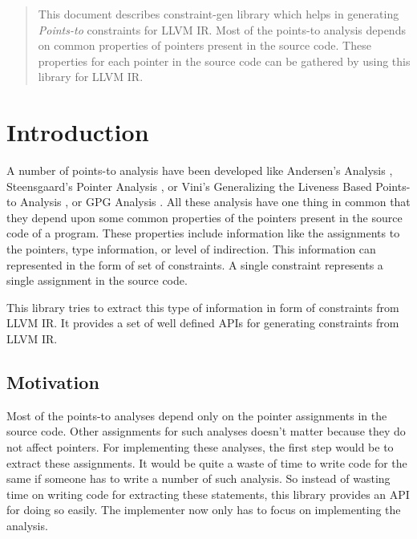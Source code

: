 \documentclass[a4paper,12pt]{report}
\begin{document}
\begin{abstract}

This document describes constraint-gen library which helps in generating \textit{Points-to}
constraints for LLVM IR. Most of the points-to analysis depends on common
properties of pointers present in the source code. These properties for
each pointer in the source code can be gathered by using this library for
LLVM IR.

\end{abstract}

\tableofcontents

\listoftables

\chapter{Introduction}

A number of points-to analysis have been developed like Andersen's Analysis
\cite{Andersons}, Steensgaard's Pointer Analysis \cite{Steensgaard}, or Vini's
Generalizing the Liveness Based Points-to Analysis \cite{Vini:2014}, or GPG Analysis \cite{Pritams}. All these
analysis have one thing in common that they depend upon some common properties of
the pointers  present in the source code of a program. These properties include
information like the assignments to the pointers, type information, or level
of indirection. This information can represented in the form of set of constraints.
A single constraint represents a single assignment in the source code.

This library tries to extract this type of information in form of constraints 
from LLVM IR. It provides a set of well defined APIs for generating constraints 
from LLVM IR.

\section{Motivation}
Most of the points-to analyses depend only on the pointer assignments in
the source code. Other assignments for such analyses doesn't matter because
they do not affect pointers. For implementing these analyses, the
first step would be to extract these assignments. It would be quite a waste of time
to write code for the same if someone has to write a number of such analysis.
So instead of wasting time on writing code for extracting these statements,
this library provides an API for doing so easily. The implementer now only
has to focus on implementing the analysis.
\end{document}
